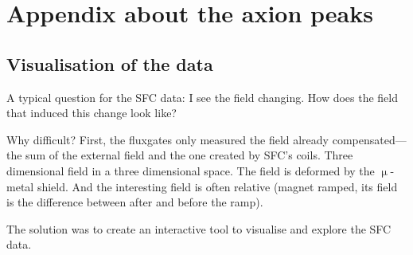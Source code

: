 \chapter{Appendix about the axion peaks}
\label{ch:sfc_appendix}

\section{Visualisation of the data}
A typical question for the SFC data: I see the field changing. How does the field that induced this change look like?

Why difficult? First, the fluxgates only measured the field already compensated---the sum of the external field and the one created by SFC's coils. Three dimensional field in a three dimensional space. The field is deformed by the $\upmu$-metal shield. And the interesting field is often relative (magnet ramped, its field is the difference between after and before the ramp).

The solution was to create an interactive tool to visualise and explore the SFC data.

